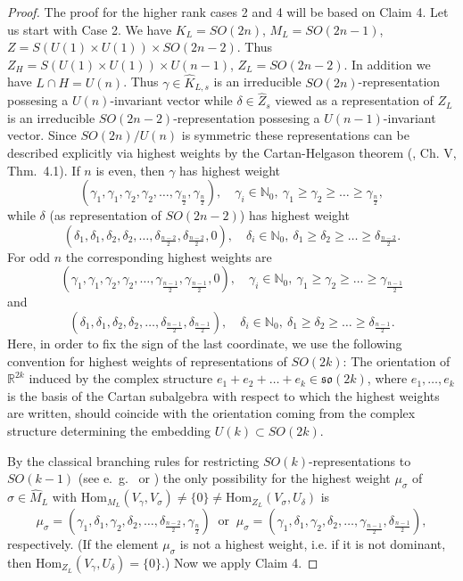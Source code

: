 \documentclass[10]{amsart}
\theoremstyle{remark}
\theoremstyle{definition}
\numberwithin{equation}{section}
\newcommand{\R}{\mathbb{R}}           %
\newcommand{\N}{\mathbb{N}}           %
\newcommand{\Hom}{\mathrm{Hom}}
\newcommand{\fo}{{\mathfrak{so}}}
\begin{document}
{\begin{proof}
The proof for the higher rank cases 2 and 4 will be based on Claim 4. Let us start with Case 2. We have $K_L=SO(2n)$, $M_L=SO(2n-1)$, $Z=S(U(1)\times U(1))\times SO(2n-2)$. Thus $Z_H=S(U(1)\times U(1))\times U(n-1)$, $Z_L=SO(2n-2)$. In addition we have $L\cap H= U(n)$. Thus $\gamma\in\widehat K_{L,s}$ is an irreducible $SO(2n)$-representation possesing
a $U(n)$-invariant vector while $\delta\in \widehat Z_s$ viewed as a representation of $Z_L$ is an irreducible $SO(2n-2)$-representation possesing a $U(n-1)$-invariant vector.
Since $SO(2n)/U(n)$ is symmetric these representations can be described explicitly via highest weights by the Cartan-Helgason theorem (\cite{Hel84}, Ch. V, Thm.~4.1). If $n$ is even,
then $\gamma$ has highest weight
$$ (\gamma_1,\gamma_1,\gamma_2,\gamma_2,\dots,\gamma_{\frac{n}{2}},\gamma_{\frac{n}{2}}),\quad \gamma_i\in\N_0,\ \gamma_1\ge\gamma_2\ge\dots\ge\gamma_{\frac{n}{2}},$$
while $\delta$ (as representation of $SO(2n-2)$) has highest weight
$$  (\delta_1,\delta_1,\delta_2,\delta_2,\dots,\delta_{\frac{n-2}{2}},\delta_{\frac{n-2}{2}},0),\quad \delta_i\in\N_0,\ \delta_1\ge\delta_2\ge\dots\ge\delta_{\frac{n-2}{2}}.$$
For odd $n$ the corresponding highest weights are
$$ (\gamma_1,\gamma_1,\gamma_2,\gamma_2,\dots,\gamma_{\frac{n-1}{2}},\gamma_{\frac{n-1}{2}},0),\quad \gamma_i\in\N_0,\ \gamma_1\ge\gamma_2\ge\dots\ge\gamma_{\frac{n-1}{2}}$$
and
$$  (\delta_1,\delta_1,\delta_2,\delta_2,\dots,\delta_{\frac{n-1}{2}},\delta_{\frac{n-1}{2}}),\quad \delta_i\in\N_0,\ \delta_1\ge\delta_2\ge\dots\ge\delta_{\frac{n-1}{2}}.$$
Here, in order to fix the sign of the last coordinate, we use the following convention for highest weights of representations of $SO(2k)$: The orientation of $\R^{2k}$ induced by the complex structure $e_1+e_2+\dots+e_k\in\fo(2k)$,
where $e_1,\dots,e_k$ is the basis of the Cartan subalgebra with respect to which the highest weights are written, should coincide with the orientation coming from the complex structure
determining the embedding $U(k)\subset SO(2k)$.  

By the classical branching rules for restricting $SO(k)$-representations to $SO(k-1)$ (see e.~g.~\cite{Zhe73} or \cite{GW98}) the only possibility for the highest weight $\mu_\sigma$ of $\sigma\in \widehat M_{L}$ with
$\Hom_{M_L}(V_\gamma, V_{\sigma})\ne\{0\}\ne \Hom_{Z_L}(V_\sigma,U_\delta)$ is
$$ \mu_\sigma=(\gamma_1,\delta_1,\gamma_2,\delta_2,\dots,\delta_{\frac{n-2}{2}},\gamma_{\frac{n}{2}})\ \mbox{ or }\  \mu_\sigma=(\gamma_1,\delta_1,\gamma_2,\delta_2,\dots,\gamma_{\frac{n-1}{2}},\delta_{\frac{n-1}{2}}),$$
respectively. (If the element $\mu_\sigma$ is not a highest weight, i.e. if it is not dominant, then $\Hom_{Z_L}(V_\gamma,U_\delta)=\{0\}$.) Now we apply Claim 4.


\end{proof}}
\end{document}
